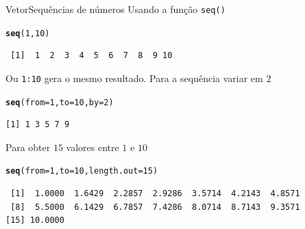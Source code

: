\documentclass[10pt,handout]{beamer}\usepackage[]{graphicx}\usepackage[]{color}
\makeatletter
\newcommand{\hlnum}[1]{\textcolor[rgb]{0.686,0.059,0.569}{#1}}%
\newcommand{\hlstd}[1]{\textcolor[rgb]{0.345,0.345,0.345}{#1}}%
\newcommand{\hlkwc}[1]{\textcolor[rgb]{0.333,0.667,0.333}{#1}}%
\newcommand{\hlkwd}[1]{\textcolor[rgb]{0.737,0.353,0.396}{\textbf{#1}}}%
\newenvironment{kframe}{%
 \def\at@end@of@kframe{}%
 \ifinner\ifhmode%
  \def\at@end@of@kframe{\end{minipage}}%
  \begin{minipage}{\columnwidth}%
 \fi\fi%
 \def\FrameCommand##1{\hskip\@totalleftmargin \hskip-\fboxsep
 \colorbox{shadecolor}{##1}\hskip-\fboxsep
     \hskip-\linewidth \hskip-\@totalleftmargin \hskip\columnwidth}%
 \MakeFramed {\advance\hsize-\width
   \@totalleftmargin\z@ \linewidth\hsize
   \@setminipage}}%
 {\par\unskip\endMakeFramed%
 \at@end@of@kframe}
\newenvironment{knitrout}{}{} %
\makeatother
\begin{document}
\begin{frame}[fragile]{Vetor}{Sequências de números}
  Usando a função \verb|seq()|
\begin{knitrout}\small
{}\color{fgcolor}\begin{kframe}
\begin{alltt}
\hlkwd{seq}\hlstd{(}\hlnum{1}\hlstd{,} \hlnum{10}\hlstd{)}
\end{alltt}
\begin{verbatim}
 [1]  1  2  3  4  5  6  7  8  9 10
\end{verbatim}
\end{kframe}
\end{knitrout}
Ou \verb|1:10| gera o mesmo resultado. Para a sequência variar em $2$
\begin{knitrout}\small
{}\color{fgcolor}\begin{kframe}
\begin{alltt}
\hlkwd{seq}\hlstd{(}\hlkwc{from} \hlstd{=} \hlnum{1}\hlstd{,} \hlkwc{to} \hlstd{=} \hlnum{10}\hlstd{,} \hlkwc{by} \hlstd{=} \hlnum{2}\hlstd{)}
\end{alltt}
\begin{verbatim}
[1] 1 3 5 7 9
\end{verbatim}
\end{kframe}
\end{knitrout}
Para obter $15$ valores entre $1$ e $10$
\begin{knitrout}\small
{}\color{fgcolor}\begin{kframe}
\begin{alltt}
\hlkwd{seq}\hlstd{(}\hlkwc{from} \hlstd{=} \hlnum{1}\hlstd{,} \hlkwc{to} \hlstd{=} \hlnum{10}\hlstd{,} \hlkwc{length.out} \hlstd{=} \hlnum{15}\hlstd{)}
\end{alltt}
\begin{verbatim}
 [1]  1.0000  1.6429  2.2857  2.9286  3.5714  4.2143  4.8571
 [8]  5.5000  6.1429  6.7857  7.4286  8.0714  8.7143  9.3571
[15] 10.0000
\end{verbatim}
\end{kframe}
\end{knitrout}
\end{frame}
\end{document}
